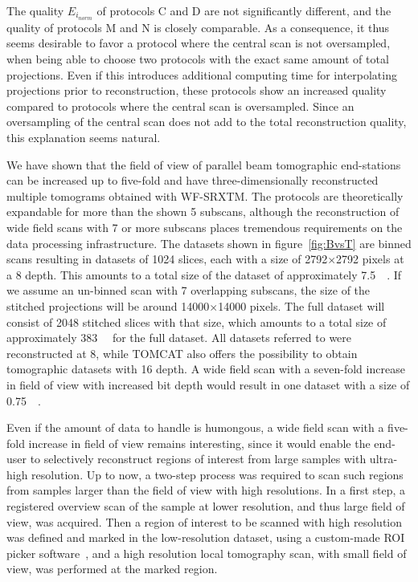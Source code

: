 The quality $E_{i_{norm}}$ of protocols C and D are not significantly different, and the quality of protocols M and N is closely comparable. As a consequence, it thus seems desirable to favor a protocol where the central scan is not oversampled, when being able to choose two protocols with the exact same amount of total projections. Even if this introduces additional computing time for interpolating projections prior to reconstruction, these protocols show an increased quality compared to protocols where the central scan is oversampled. Since an oversampling of the central scan does not add to the total reconstruction quality, this explanation seems natural.

We have shown that the field of view of parallel beam tomographic end-stations can be increased up to five-fold and have three-dimensionally reconstructed multiple tomograms obtained with WF-SRXTM. The protocols are theoretically expandable for more than the shown 5 subscans, although the reconstruction of wide field scans with 7 or more subscans places tremendous requirements on the data processing infrastructure. The datasets shown in figure~\ref{fig:BvsT} are binned scans resulting in datasets of 1024 slices, each with a size of 2792$\times$2792 pixels at a \SI{8}{\bit} depth. This amounts to a total size of the dataset of approximately \SI{7.5}{\giga\byte}. If we assume an un-binned scan with 7 overlapping subscans, the size of the stitched projections will be around 14000$\times$14000 pixels. The full dataset will consist of 2048 stitched slices with that size, which amounts to a total size of approximately \SI{383}{\giga\byte} for the full dataset. All datasets referred to were reconstructed at \SI{8}{\bit}, while TOMCAT also offers the possibility to obtain tomographic datasets with \SI{16}{\bit} depth. A wide field scan with a seven-fold increase in field of view with increased bit depth would result in one dataset with a size of \SI{0.75}{\tera\byte}.

Even if the amount of data to handle is humongous, a wide field scan with a five-fold increase in field of view remains interesting, since it would enable the end-user to selectively reconstruct regions of interest from large samples with ultra-high resolution. Up to now, a two-step process was required to scan such regions from samples larger than the field of view with high resolutions. In a first step, a registered overview scan of the sample at lower resolution, and thus large field of view, was acquired. Then a region of interest to be scanned with high resolution was defined and marked in the low-resolution dataset, using a custom-made ROI picker software~\cite{Heinzer2008}, and a high resolution local tomography scan, with small field of view, was performed at the marked region.

